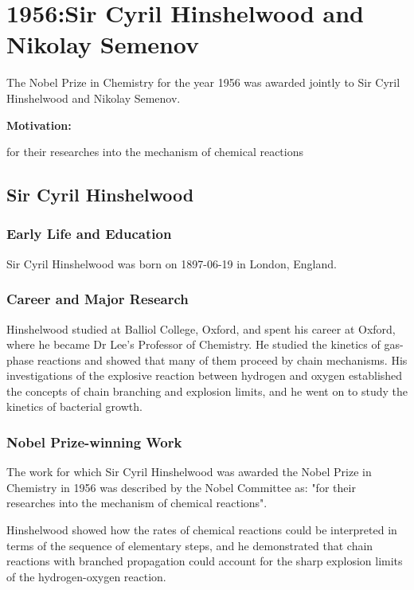 \chapter{1956:Sir Cyril Hinshelwood and Nikolay Semenov}

\label{chap:chemistry1956}

The Nobel Prize in Chemistry for the year 1956 was awarded jointly to Sir Cyril Hinshelwood and Nikolay Semenov.

\textbf{Motivation:}

for their researches into the mechanism of chemical reactions

\section{Sir Cyril Hinshelwood}

\subsection*{Early Life and Education}

Sir Cyril Hinshelwood was born on 1897-06-19 in London, England.

\subsection*{Career and Major Research}

Hinshelwood studied at Balliol College, Oxford, and spent his career at Oxford, where he became Dr Lee's Professor of Chemistry. He studied the kinetics of gas-phase reactions and showed that many of them proceed by chain mechanisms. His investigations of the explosive reaction between hydrogen and oxygen established the concepts of chain branching and explosion limits, and he went on to study the kinetics of bacterial growth.

\subsection*{Nobel Prize-winning Work}

The work for which Sir Cyril Hinshelwood was awarded the Nobel Prize in Chemistry in 1956 was described by the Nobel Committee as: "for their researches into the mechanism of chemical reactions".

Hinshelwood showed how the rates of chemical reactions could be interpreted in terms of the sequence of elementary steps, and he demonstrated that chain reactions with branched propagation could account for the sharp explosion limits of the hydrogen-oxygen reaction.

